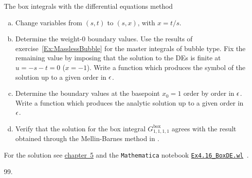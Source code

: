 \begin{exer}{The box integrals with the differential equations method}
\begin{enumerate}[a)]
\item Change variables from $(s,t)$ to $(s,x)$, with $x=t/s$.

\item Determine the weight-0 boundary values. Use the results of exercise~\ref{Ex:MasslessBubble} for the master integrals of bubble type. Fix the remaining value by imposing that the solution to the DEs is finite at $u=-s-t = 0$ ($x=-1$). Write a function which produces the symbol of the solution up to a given order in $\epsilon$.

\item Determine the boundary values at the basepoint $x_0 = 1$ order by order in $\epsilon$. 
Write a function which produces the analytic solution up to a given order in $\epsilon$.

\item Verify that the solution for the box integral $G^{\text{box}}_{1,1,1,1}$ agrees with the result obtained through the Mellin-Barnes method in .

\end{enumerate}
For the solution see \hyperref[Sol:4.BoxDE]{chapter~5} and the \texttt{Mathematica} notebook \href{https://scattering-amplitudes.mpp.mpg.de/scattering-amplitudes-in-qft/Exercises/}{\texttt{Ex4.16\_BoxDE.wl}}~\cite{ch4website-ch4}. 

\end{exer}



\begin{thebibliography}{99.}

\end{thebibliography}
